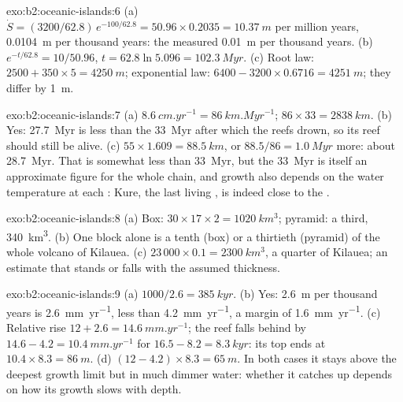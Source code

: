 \begin{solution}{exo:b2:oceanic-islands:6}
(a) $\dot S = (3200/62.8)\,e^{-100/62.8} = 50.96\times0.2035 = \qty{10.37}{m}$ per million years,
\qty{0.0104}{m} per thousand years: the measured \qty{0.01}{m} per thousand years. (b) $e^{-t/62.8}
= 10/50.96$, $t = 62.8\ln5.096 = \qty{102.3}{Myr}$. (c) Root law: $2500 + 350\times5 =
\qty{4250}{m}$; exponential law: $6400 - 3200\times0.6716 = \qty{4251}{m}$; they differ by
\qty{1}{m}.
\end{solution}

\begin{solution}{exo:b2:oceanic-islands:7}
(a) $\qty{8.6}{cm.yr^{-1}} = \qty{86}{km.Myr^{-1}}$; $86\times33 = \qty{2838}{km}$. (b) Yes:
\qty{27.7}{Myr} is less than the \qty{33}{Myr} after which the reefs drown, so its reef should
still be alive. (c) $55\times1.609 = \qty{88.5}{km}$, or $88.5/86 = \qty{1.0}{Myr}$ more: about
\qty{28.7}{Myr}. That is somewhat less than \qty{33}{Myr}, but the \qty{33}{Myr} is itself an
approximate figure for the whole chain, and growth also depends on the water temperature at each
: Kure, the last living , is indeed close to the .
\end{solution}

\begin{solution}{exo:b2:oceanic-islands:8}
(a) Box: $30\times17\times2 = \qty{1020}{km^3}$; pyramid: a third, \qty{340}{km^3}. (b) One block
alone is a tenth (box) or a thirtieth (pyramid) of the whole volcano of Kilauea. (c) $23\,000\times
0.1 = \qty{2300}{km^3}$, a quarter of Kilauea; an estimate that stands or falls with the assumed
thickness.
\end{solution}

\begin{solution}{exo:b2:oceanic-islands:9}
(a) $1000/2.6 = \qty{385}{kyr}$. (b) Yes: \qty{2.6}{m} per thousand years is
\qty{2.6}{mm.yr^{-1}}, less than \qty{4.2}{mm.yr^{-1}}, a margin of \qty{1.6}{mm.yr^{-1}}.
(c) Relative rise $12 + 2.6 = \qty{14.6}{mm.yr^{-1}}$; the reef falls behind by $14.6 - 4.2 =
\qty{10.4}{mm.yr^{-1}}$ for $16.5 - 8.2 = \qty{8.3}{kyr}$: its top ends at $10.4\times8.3 =
\qty{86}{m}$. (d) $(12 - 4.2)\times8.3 = \qty{65}{m}$. In both cases it stays above the deepest
growth limit but in much dimmer water: whether it catches up depends on how its growth slows with
depth.
\end{solution}

